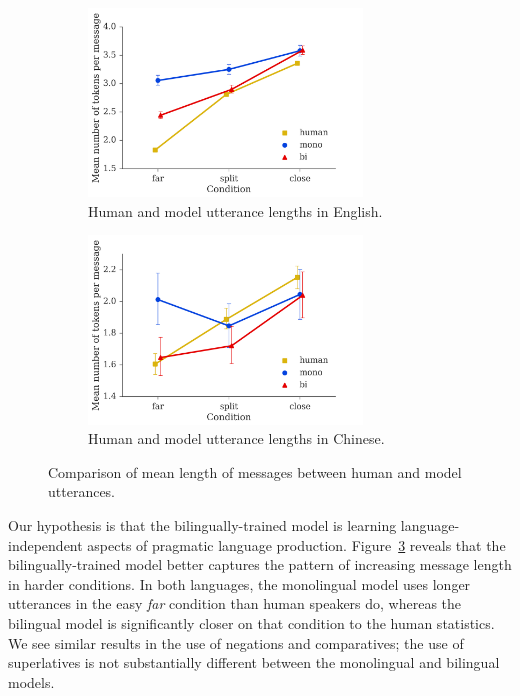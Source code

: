 \documentclass[11pt,a4paper]{article}
\renewcommand{\|}{\mid}
\newcommand{\figref}[1]{Figure~\ref{#1}}
\begin{document}
\begin{figure}[!t]
    \begin{subfigure}[b]{\columnwidth}
    \centering
    \includegraphics[width=0.8\textwidth]{models_en_tokens.png}
    \caption{Human and model utterance lengths in English.}
    \label{fig:models_length:en}
    \end{subfigure}

    \begin{subfigure}[b]{\columnwidth}
    \centering
    \includegraphics[width=0.8\textwidth]{models_zh_tokens.png}
    \caption{Human and model utterance lengths in Chinese.}
    \label{fig:models_length:zh}
    \end{subfigure}
\caption{Comparison of mean length of messages between human and model utterances.}
\label{fig:models_length}
\end{figure}

Our hypothesis is that the bilingually-trained model is learning language-independent aspects
of pragmatic language production. \figref{fig:models_length} reveals that the bilingually-trained model better
captures the pattern of increasing message length in harder conditions. In both languages, the monolingual model
uses longer utterances in the easy \emph{far} condition than human speakers do, whereas the bilingual model is
significantly closer on that condition to the human statistics. We see similar results in the use of negations
and comparatives; the use of superlatives is not substantially different between the monolingual and bilingual
models.
\end{document}
